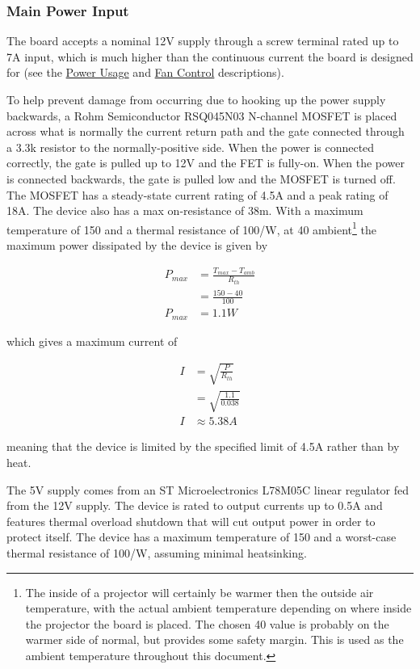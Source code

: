 \documentclass{article}
\begin{document}
\subsubsection{Main Power Input} \label{sssec:MainPower}
The board accepts a nominal 12V supply through a screw terminal rated up to 7A input, which is much
higher than the continuous current the board is designed for (see the
\hyperref[ssec:PowerUsage]{Power Usage} and \hyperref[sssec:FanControl]{Fan Control} descriptions).

To help prevent damage from occurring due to hooking up the power supply backwards, a Rohm
Semiconductor RSQ045N03 N-channel MOSFET is placed across what is normally the current return path
and the gate connected through a 3.3k\textOmega{} resistor to the normally-positive side.  When the
power is connected correctly, the gate is pulled up to 12V and the FET is fully-on.  When the power
is connected backwards, the gate is pulled low and the MOSFET is turned off.  The MOSFET has a
steady-state current rating of 4.5A and a peak rating of 18A.  The device also has a max
on-resistance of 38m\textOmega{}.  With a maximum temperature of 150\textcelsius{} and a thermal
resistance of 100\textcelsius{}/W, at 40\textcelsius{} ambient\footnote{The inside of a projector
  will certainly be warmer then the outside air temperature, with the actual ambient temperature
  depending on where inside the projector the board is placed.  The chosen 40\textcelsius{} value is
  probably on the warmer side of normal, but provides some safety margin.  This is used as the
  ambient temperature throughout this document.} the maximum power dissipated by the device is given
by

\begin{align*}
    P_{max} &= \frac{T_{max}-T_{amb}}{R_{th}} \\
    &= \frac{150 - 40}{100} \\
    P_{max} &= 1.1W
\end{align*}

which gives a maximum current of

\begin{align*}
    I &= \sqrt{\frac{P}{R_{th}}} \\
    &= \sqrt{\frac{1.1}{0.038}} \\
    I &\approx 5.38A
\end{align*}

meaning that the device is limited by the specified limit of 4.5A rather than by heat.

The 5V supply comes from an ST Microelectronics L78M05C linear regulator fed from the 12V supply.
The device is rated to output currents up to 0.5A and features thermal overload shutdown that will
cut output power in order to protect itself.  The device has a maximum temperature of
150\textcelsius{} and a worst-case thermal resistance of 100\textcelsius{}/W, assuming minimal
heatsinking.
\end{document}
